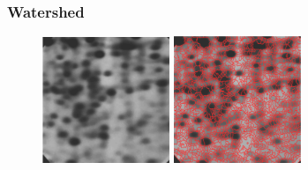 \documentclass[notheorems,mathserif,table,compress]{beamer}  %
\begin{document}
\begin{frame}
  \frametitle{Watershed}
  \begin{figure}[!ht]
  \begin{minipage}[t]{0.35\textwidth}
  \centering
  \includegraphics[width=1.5in]{water_origin.png}
  \end{minipage}
  \begin{minipage}[t]{0.35\textwidth}
  \centering
  \includegraphics[width=1.5in]{water_over.png}
  \end{minipage} 
  \end{figure}  
\end{frame}
\end{document}
